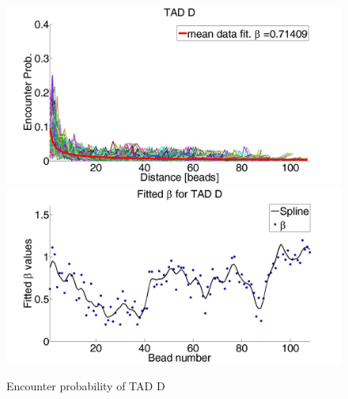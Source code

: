 \documentclass[12pt]{paper}
\begin{document}
\begin{figure}[H]
\includegraphics[scale=0.3]{meanDataFitTADD}
\includegraphics[scale=0.3]{fittedExpValuesWithSplineAverageTADD}
\caption{Encounter probability of TAD D}
\label{figure_encounterProbabilityTADD+fittedBeta}
\end{figure}
\end{document}
